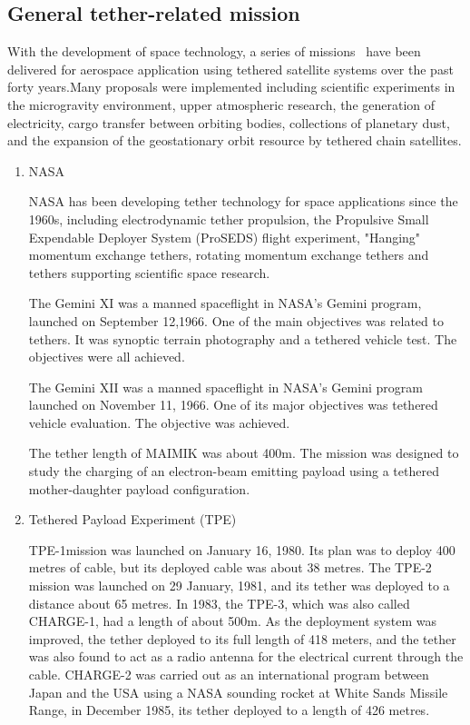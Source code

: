 \subsection{General tether-related mission}
With the development of space technology, a series of missions~\cite{cartmell2008review,van2009space,carroll1995tethers,carroll1985guidebook,johnson1999overview,carroll2002space,klinkrad2006space} have been delivered for aerospace application using tethered satellite systems over the past forty years.Many proposals were implemented including scientific experiments in the microgravity environment, upper atmospheric research, the generation of electricity, cargo transfer between orbiting bodies, collections of planetary dust, and the expansion of
the geostationary orbit resource by tethered chain satellites.
\begin{enumerate} 
\item{NASA}
 
NASA has been developing tether technology for space applications since the 1960s, including electrodynamic tether propulsion, the Propulsive Small Expendable Deployer System (ProSEDS) flight experiment, "Hanging" momentum exchange tethers, rotating momentum exchange tethers and tethers supporting scientific space research. 

The Gemini XI was a manned spaceflight in NASA's Gemini program, launched on September 12,1966. One of the main objectives was related to tethers. It was synoptic terrain photography and a tethered vehicle test. The objectives were all achieved. 

The Gemini XII was a manned spaceflight in NASA's Gemini program launched on November 11, 1966. One of its major objectives was tethered vehicle evaluation. The objective was achieved.

The tether length of MAIMIK was about 400m. The mission was designed to study the charging of an electron-beam emitting payload using a tethered mother-daughter payload configuration. 
\item{Tethered Payload Experiment (TPE)}

TPE-1mission was launched on January 16, 1980. Its plan was to deploy 400 metres of cable, but its deployed cable was about 38 metres. The TPE-2 mission was launched on 29 January, 1981, and its tether was deployed to a distance about 65 metres. In 1983, the TPE-3, which was also called CHARGE-1, had a length of about 500m. As the deployment system was improved, the tether deployed to its full length of 418 meters, and the tether was also found to act as a radio antenna for the electrical current through the cable. CHARGE-2 was carried out as an international program between Japan and the USA using a NASA sounding rocket at White Sands Missile Range, in December 1985, its tether deployed to a length of 426 metres.


\end{enumerate}

